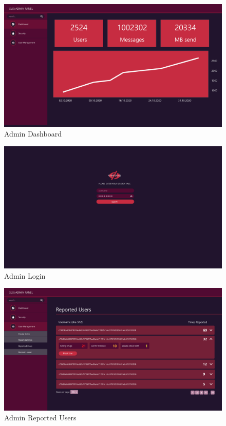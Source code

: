 \begin{figure}[h]
    \centering
    \includegraphics[width=1.0\textwidth]{./graphics/wireframes/AdminDashboard}
    \caption{Admin Dashboard}
    \label{fig:figure9}
\end{figure}

\begin{figure}[h]
    \centering
    \includegraphics[width=1.0\textwidth]{./graphics/wireframes/AdminLogin}
    \caption{Admin Login}
    \label{fig:figure10}
\end{figure}

\begin{figure}[h]
    \centering
    \includegraphics[width=1.0\textwidth]{./graphics/wireframes/AdminReportedUsers}
    \caption{Admin Reported Users}
    \label{fig:figure11}
\end{figure}

